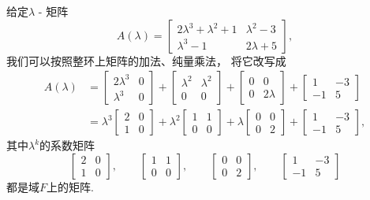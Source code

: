 \begin{example}
给定\(\lambda\) - 矩阵\begin{equation*}
	A(\lambda) = \begin{bmatrix}
		2 \lambda^3 + \lambda^2 + 1 & \lambda^2 - 3 \\
		\lambda^3 - 1 & 2 \lambda + 5
	\end{bmatrix},
\end{equation*}
我们可以按照整环上矩阵的加法、纯量乘法，
将它改写成\begin{align*}
	A(\lambda)
	&= \begin{bmatrix}
		2 \lambda^3 & 0 \\
		\lambda^3 & 0
	\end{bmatrix}
	+ \begin{bmatrix}
		\lambda^2 & \lambda^2 \\
		0 & 0
	\end{bmatrix}
	+ \begin{bmatrix}
		0 & 0 \\
		0 & 2 \lambda
	\end{bmatrix}
	+ \begin{bmatrix}
		1 & -3 \\
		-1 & 5
	\end{bmatrix} \\
	&= \lambda^3
	\begin{bmatrix}
		2 & 0 \\
		1 & 0
	\end{bmatrix}
	+ \lambda^2
	\begin{bmatrix}
		1 & 1 \\
		0 & 0
	\end{bmatrix}
	+ \lambda
	\begin{bmatrix}
		0 & 0 \\
		0 & 2
	\end{bmatrix}
	+ \begin{bmatrix}
		1 & -3 \\
		-1 & 5
	\end{bmatrix},
\end{align*}
其中\(\lambda^k\)的系数矩阵\begin{equation*}
	\begin{bmatrix}
		2 & 0 \\
		1 & 0
	\end{bmatrix},
	\qquad
	\begin{bmatrix}
		1 & 1 \\
		0 & 0
	\end{bmatrix},
	\qquad
	\begin{bmatrix}
		0 & 0 \\
		0 & 2
	\end{bmatrix},
	\qquad
	\begin{bmatrix}
		1 & -3 \\
		-1 & 5
	\end{bmatrix}
\end{equation*}都是域\(F\)上的矩阵.
\end{example}

